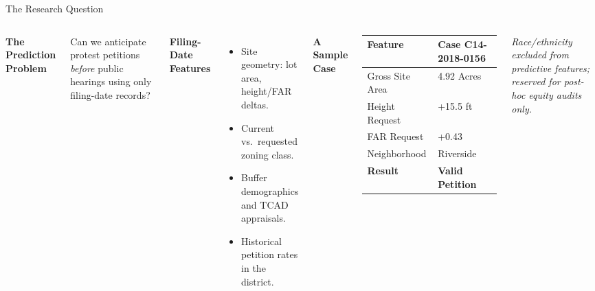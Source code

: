 \documentclass[10pt, aspectratio=169]{beamer}
\begin{document}
\begin{frame}{The Research Question}
    \begin{columns}
        \textbf{The Prediction Problem}
        \vspace{0.5em}

        {\large Can we anticipate protest petitions \textit{before} public hearings using only filing-date records?}

        \vspace{1.2em}
        \textbf{Filing-Date Features}
        \begin{itemize}
            \item Site geometry: lot area, height/FAR deltas.
            \item Current vs.\ requested zoning class.
            \item Buffer demographics and TCAD appraisals.
            \item Historical petition rates in the district.
        \end{itemize}

        \textbf{A Sample Case}
        \vspace{1em}
        {\footnotesize
        \begin{tabular}{ll}
            \toprule
            Feature & Case C14-2018-0156 \\
            \midrule
            Gross Site Area & 4.92 Acres \\
            Height Request & +15.5 ft \\
            FAR Request & +0.43 \\
            Neighborhood & Riverside \\
            \textbf{Result} & \textbf{Valid Petition} \\
            \bottomrule
        \end{tabular}
        }
        \vspace{1em}

        \small \textit{Race/ethnicity excluded from predictive features; reserved for post-hoc equity audits only.}
    \end{columns}
\end{frame}
\end{document}
